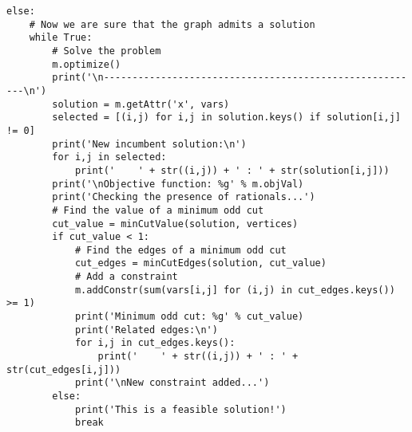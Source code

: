 \begin{verbatim}
else:
    # Now we are sure that the graph admits a solution
    while True:
        # Solve the problem
        m.optimize()
        print('\n--------------------------------------------------------\n')
        solution = m.getAttr('x', vars)
        selected = [(i,j) for i,j in solution.keys() if solution[i,j] != 0]
        print('New incumbent solution:\n')
        for i,j in selected:
            print('    ' + str((i,j)) + ' : ' + str(solution[i,j]))
        print('\nObjective function: %g' % m.objVal)
        print('Checking the presence of rationals...')
        # Find the value of a minimum odd cut
        cut_value = minCutValue(solution, vertices)
        if cut_value < 1:
            # Find the edges of a minimum odd cut
            cut_edges = minCutEdges(solution, cut_value)
            # Add a constraint
            m.addConstr(sum(vars[i,j] for (i,j) in cut_edges.keys()) >= 1)
            print('Minimum odd cut: %g' % cut_value)
            print('Related edges:\n')
            for i,j in cut_edges.keys():
                print('    ' + str((i,j)) + ' : ' + str(cut_edges[i,j]))
            print('\nNew constraint added...')
        else:
            print('This is a feasible solution!')
            break
\end{verbatim}